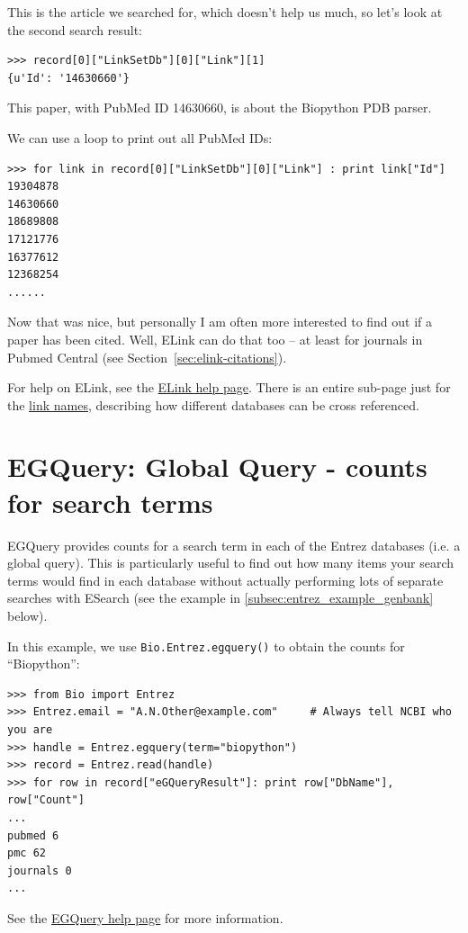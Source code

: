\documentclass{report}
\begin{document}
\noindent This is the article we searched for, which doesn't help us much, so let's look at the second search result:

\begin{verbatim}
>>> record[0]["LinkSetDb"][0]["Link"][1]
{u'Id': '14630660'}
\end{verbatim}

\noindent This paper, with PubMed ID 14630660, is about the Biopython PDB parser.

We can use a loop to print out all PubMed IDs:
\begin{verbatim}
>>> for link in record[0]["LinkSetDb"][0]["Link"] : print link["Id"]
19304878
14630660
18689808
17121776
16377612
12368254
......
\end{verbatim}

Now that was nice, but personally I am often more interested to find out if a paper has been cited.
Well, ELink can do that too -- at least for journals in Pubmed Central (see Section~\ref{sec:elink-citations}).

For help on ELink, see the \href{http://www.ncbi.nlm.nih.gov/entrez/query/static/elink\_help.html}{ELink help page}.
There is an entire sub-page just for the \href{http://eutils.ncbi.nlm.nih.gov/corehtml/query/static/entrezlinks.html}{link names}, describing how different databases can be cross referenced.

\section{EGQuery: Global Query - counts for search terms}
EGQuery provides counts for a search term in each of the Entrez databases (i.e. a global query). This is particularly useful to find out how many items your search terms would find in each database without actually performing lots of separate searches with ESearch (see the example in \ref{subsec:entrez_example_genbank} below).

In this example, we use \verb+Bio.Entrez.egquery()+ to obtain the counts for ``Biopython'':

\begin{verbatim}
>>> from Bio import Entrez
>>> Entrez.email = "A.N.Other@example.com"     # Always tell NCBI who you are
>>> handle = Entrez.egquery(term="biopython")
>>> record = Entrez.read(handle)
>>> for row in record["eGQueryResult"]: print row["DbName"], row["Count"]
...
pubmed 6
pmc 62
journals 0
...
\end{verbatim}
See the \href{http://www.ncbi.nlm.nih.gov/entrez/query/static/egquery\_help.html}{EGQuery help page} for more information.
\end{document}
